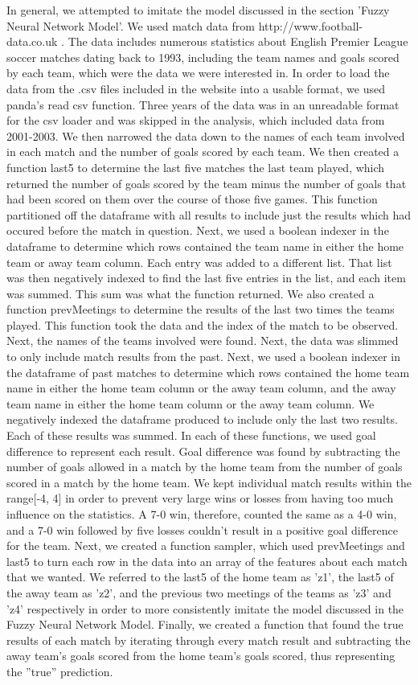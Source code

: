 \documentclass[sigconf]{acmart}
\begin{document}
In general, we attempted to imitate the model discussed in the section 'Fuzzy Neural Network Model'. We used match data from http://www.football-data.co.uk \cite{SoccerData}. The data includes numerous statistics about English Premier League soccer matches dating back to 1993, including the team names and goals scored by each team, which were the data we were interested in. In order to load the data from the .csv files included in the website into a usable format, we used panda's read csv function. Three years of the data was in an unreadable format for the csv loader and was skipped in the analysis, which included data from 2001-2003. We then narrowed the data down to the names of each team involved in each match and the number of goals scored by each team. We then created a function last5 to determine the last five matches the last team played, which returned the number of goals scored by the team minus the number of goals that had been scored on them over the course of those five games. This function partitioned off the dataframe with all results to include just the results which had occured before the match in question. Next, we used a boolean indexer in the dataframe to determine which rows contained the team name in either the home team or away team column. Each entry was added to a different list. That list was then negatively indexed to find the last five entries in the list, and each item was summed. This sum was what the function returned. We also created a function prevMeetings to determine the results of the last two times the teams played. This function took the data and the index of the match to be observed. Next, the names of the teams involved were found. Next, the data was slimmed to only include match results from the past. Next, we used a boolean indexer in the dataframe of past matches to determine which rows contained the home team name in either the home team column or the away team column, and the away team name in either the home team column or the away team column. We negatively indexed the dataframe produced to include only the last two results. Each of these results was summed.  In each of these functions, we used goal difference to represent each result. Goal difference was found by subtracting the number of goals allowed in a match by the home team from the number of goals scored in a match by the home team. We kept individual match results within the range[-4, 4] in order to prevent very large wins or losses from having too much influence on the statistics. A 7-0 win, therefore, counted the same as a 4-0 win, and a 7-0 win followed by five losses couldn't result in a positive goal difference for the team. Next, we created a function sampler, which used prevMeetings and last5 to turn each row in the data into an array of the features about each match that we wanted. We referred to the last5 of the home team as 'z1', the last5 of the away team as 'z2', and the previous two meetings of the teams as 'z3' and 'z4' respectively in order to more consistently imitate the model discussed in the Fuzzy Neural Network Model. Finally, we created a function that found the true results of each match by iterating through every match result and subtracting the away team's goals scored from the home team's goals scored, thus representing the ''true'' prediction. 
\end{document}
